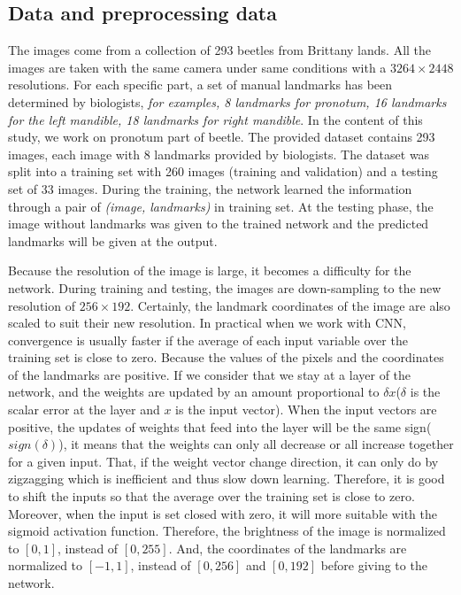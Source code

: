 \documentclass[conference]{IEEEtran}
\begin{document}
\subsection{Data and preprocessing data}
The images come from a collection of 293 beetles from Brittany lands. All the images are taken with the same camera under same conditions with a $3264 \times 2448$ resolutions. For each specific part, a set of manual landmarks has been determined by biologists, \textit{for examples, 8 landmarks for pronotum, 16 landmarks for the left mandible, 18 landmarks for right mandible}. In the content of this study, we work on pronotum part of beetle. The provided dataset contains 293 images, each image with 8 landmarks provided by biologists. The dataset was split into a training set with 260 images (training and validation) and a testing set of 33 images. During the training, the network learned the information through a pair of \textit{(image, landmarks)} in training set. At the testing phase, the image without landmarks was given to the trained network and the predicted landmarks will be given at the output.

Because the resolution of the image is large, it becomes a difficulty for the network. During training and testing, the images are down-sampling to the new resolution of $256 \times 192$. Certainly, the landmark coordinates of the image are also scaled to suit their new resolution. In practical when we work with CNN, convergence is usually faster if the average of each input variable over the training set is close to zero. Because the values of the pixels and the coordinates of the landmarks are positive. If we consider that we stay at a layer of the network, and the weights are updated by an amount proportional to $\delta x$($\delta$ is the scalar error at the layer and $x$ is the input vector). When the input vectors are positive, the updates of weights that feed into the layer will be the same sign($sign(\delta)$), it means that the weights can only all decrease or all increase together for a given input. That, if the weight vector change direction, it can only do by zigzagging which is inefficient and thus slow down learning. Therefore, it is good to shift the inputs so that the average over the training set is close to zero. Moreover, when the input is set closed with zero, it will more suitable with the sigmoid activation function\cite{lecun2012efficient}. Therefore, the brightness of the image is normalized to $[0,1]$, instead of $[0,255]$. And, the coordinates of the landmarks are normalized to $[-1,1]$, instead of $[0,256]$ and $[0,192]$ before giving to the network.
\end{document}
